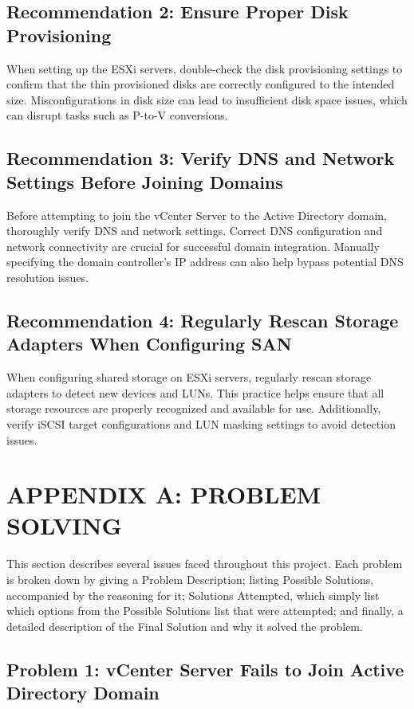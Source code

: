 \documentclass[letterpaper]{article}
\begin{document}
\subsection{Recommendation 2: Ensure Proper Disk Provisioning}
\label{sec:org68f4af2}
When setting up the ESXi servers, double-check the disk provisioning settings to confirm that the thin provisioned disks are correctly configured to the intended size. Misconfigurations in disk size can lead to insufficient disk space issues, which can disrupt tasks such as P-to-V conversions.

\subsection{Recommendation 3: Verify DNS and Network Settings Before Joining Domains}
\label{sec:orgc0a5758}
Before attempting to join the vCenter Server to the Active Directory domain, thoroughly verify DNS and network settings. Correct DNS configuration and network connectivity are crucial for successful domain integration. Manually specifying the domain controller's IP address can also help bypass potential DNS resolution issues.

\subsection{Recommendation 4: Regularly Rescan Storage Adapters When Configuring SAN}
\label{sec:orgc20bd0e}
When configuring shared storage on ESXi servers, regularly rescan storage adapters to detect new devices and LUNs. This practice helps ensure that all storage resources are properly recognized and available for use. Additionally, verify iSCSI target configurations and LUN masking settings to avoid detection issues.

\section{APPENDIX A: PROBLEM SOLVING}
\label{sec:org69f4143}

This section describes several issues faced throughout this project. Each problem is broken down by giving a Problem Description; listing Possible Solutions, accompanied by the reasoning for it; Solutions Attempted, which simply list which options from the Possible Solutions list that were attempted; and finally, a detailed description of the Final Solution and why it solved the problem.

\subsection{Problem 1: vCenter Server Fails to Join Active Directory Domain}
\label{sec:orgfa3fcbc}
\end{document}
